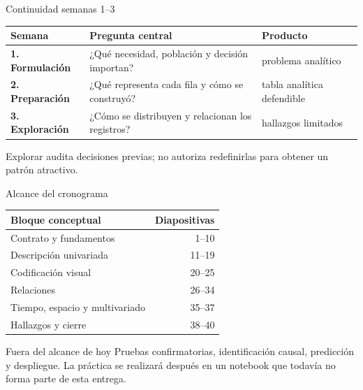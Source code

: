 \documentclass[aspectratio=169,11pt]{beamer}
\begin{document}
\begin{frame}{Continuidad semanas 1--3}
  \small
  \begin{tabularx}{\textwidth}{>{\bfseries}p{} X X}
    \toprule
    Semana & Pregunta central & Producto \\
    \midrule
    1. Formulación & ¿Qué necesidad, población y decisión importan? & problema analítico \\
    2. Preparación & ¿Qué representa cada fila y cómo se construyó? & tabla analítica defendible \\
    3. Exploración & ¿Cómo se distribuyen y relacionan los registros? & hallazgos limitados \\
    \bottomrule
  \end{tabularx}
  \vspace{.5em}
  \centering
  \par\alert{Explorar audita decisiones previas; no autoriza redefinirlas para obtener un patrón atractivo.}
\end{frame}

\begin{frame}{Alcance del cronograma}
  \small
  \begin{tabularx}{\textwidth}{X r}
    \toprule
    Bloque conceptual & Diapositivas \\
    \midrule
    Contrato y fundamentos & 1--10 \\
    Descripción univariada & 11--19 \\
    Codificación visual & 20--25 \\
    Relaciones & 26--34 \\
    Tiempo, espacio y multivariado & 35--37 \\
    Hallazgos y cierre & 38--40 \\
    \bottomrule
  \end{tabularx}
  \vfill
  \begin{alertblock}{Fuera del alcance de hoy}
    Pruebas confirmatorias, identificación causal, predicción y despliegue. La práctica se realizará después en un notebook que todavía no forma parte de esta entrega.
  \end{alertblock}
\end{frame}
\end{document}
